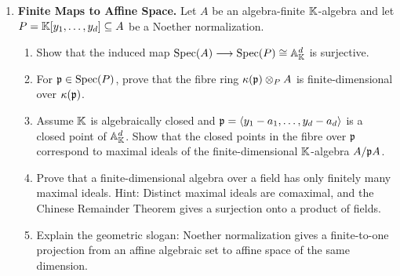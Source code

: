\documentclass[12pt,reqno]{amsart}
\begin{document}
\begin{enumerate}[leftmargin=*, resume=problems]
\item \textbf{Finite Maps to Affine Space.} Let $A$ be an algebra-finite $\mathbb{K}$-algebra and let $P=\mathbb{K}[y_1,\ldots,y_d]\subseteq A$ be a Noether normalization.
\begin{enumerate}
    \item Show that the induced map $\operatorname{Spec}(A)\longrightarrow \operatorname{Spec}(P)\cong \mathbb{A}^d_{\mathbb{K}}$ is surjective.
    \item For $\mathfrak{p}\in\operatorname{Spec}(P)$, prove that the fibre ring $\kappa(\mathfrak{p})\otimes_P A$ is finite-dimensional over $\kappa(\mathfrak{p})$.
    \item Assume $\mathbb{K}$ is algebraically closed and $\mathfrak{p}=\langle y_1-a_1,\ldots,y_d-a_d\rangle$ is a closed point of $\mathbb A^d_{\mathbb{K}}$. Show that the closed points in the fibre over $\mathfrak{p}$ correspond to maximal ideals of the finite-dimensional $\mathbb{K}$-algebra $A/\mathfrak{p} A$.
    \item Prove that a finite-dimensional algebra over a field has only finitely many maximal ideals. Hint: Distinct maximal ideals are comaximal, and the Chinese Remainder Theorem gives a surjection onto a product of fields.
    \item Explain the geometric slogan: Noether normalization gives a finite-to-one projection from an affine algebraic set to affine space of the same dimension.
\end{enumerate}
\end{enumerate}
\end{document}
